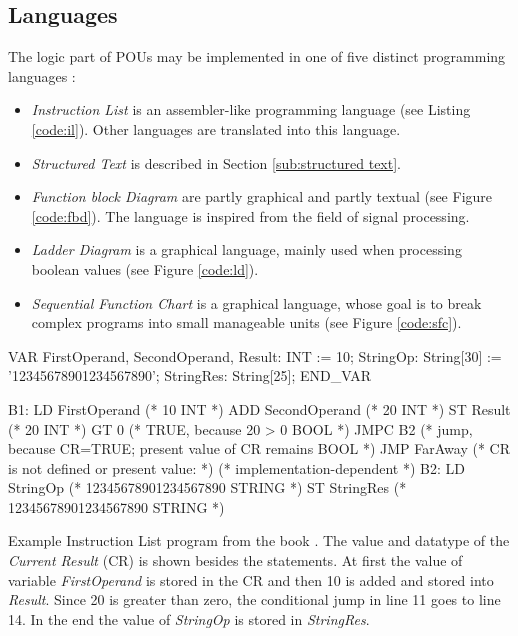 \subsection{Languages}
\label{sub:iec-lang}
The logic part of POUs may be implemented in one of five distinct programming languages \cite{johnIEC611313Programming2010}:
\begin{itemize}
	\item \emph{Instruction List} is an assembler-like programming language (see Listing \ref{code:il}). Other languages are translated into this language.
	\item \emph{Structured Text} is described in Section \ref{sub:structured text}.
	\item \emph{Function block Diagram} are partly graphical and partly textual (see Figure \ref{code:fbd}). The language is inspired from the field of signal processing. 
	\item \emph{Ladder Diagram} is a graphical language, mainly used when processing boolean values (see Figure \ref{code:ld}).
	\item \emph{Sequential Function Chart} is a graphical language, whose goal is to break complex programs into small manageable units (see Figure \ref{code:sfc}). 
\end{itemize}

\begin{program}[h!]
	\begin{GenericCode}
VAR
	FirstOperand, SecondOperand, Result: INT := 10;
	StringOp: String[30] := '12345678901234567890';
	StringRes: String[25];
END_VAR
		
B1:	LD FirstOperand (* 10 {INT} *)
ADD SecondOperand (* 20 {INT} *)
ST Result (* 20 {INT} *)
GT 0 (* TRUE, because 20 > 0 {BOOL} *)
JMPC B2 (* jump, because CR=TRUE; present value of CR remains {BOOL} *)
JMP FarAway (* CR is not defined or present value: *)
(* implementation-dependent *)
B2: LD StringOp (* 12345678901234567890 {STRING} *)
ST StringRes (* 12345678901234567890 {STRING} *)\end{GenericCode}
	\caption{Example Instruction List program from the book \cite{johnIEC611313Programming2010}. The value and datatype of the \emph{Current Result} (CR) is shown besides the statements. At first the value of variable \emph{FirstOperand} is stored in the CR and then 10 is added and stored into \emph{Result}. Since 20 is greater than zero, the conditional jump in line 11 goes to line 14. In the end the value of \emph{StringOp} is stored in \emph{StringRes}. }
	\label{code:il}
\end{program}

